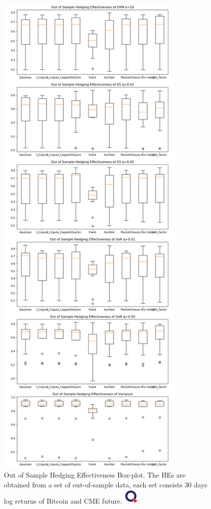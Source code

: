 \begin{figure}[!th]
   \centering
   \includegraphics[height=25cm]{_pics/Out of Sample Hedging Effectiveness.png}
   \caption{Out of Sample Hedging Effectiveness Box-plot.
   The HEs are obtained from a set of out-of-sample data,
   each set consists 30 days log returns of Bitcoin and CME future.
   \href{http://www.quantlet.com/}{\includegraphics[width=20pt]{_pics/qletlogo_tr.png}}}
   \label{fig:OOSHE}
\end{figure}

